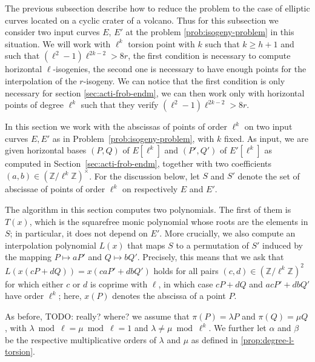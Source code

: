 \documentclass{lms}
\newcommand{\todo}[1]{{\color{red}TODO: #1}}
\begin{document}
 The previous subsection describe how to reduce the problem to the case of elliptic curves located on a cyclic crater of a volcano. Thus for this subsection we consider two input curves $E$, $E'$ at the problem \ref{prob:isogeny-problem} in this situation. We will work with $\ell^{k}$ torsion point with $k$ such that $k \geqslant h+1$ and such that $(\ell^2-1)\ell^{2k-2}> 8 r$, the first condition is necessary to compute horizontal $\ell$-isogenies, the second one is necessary to have enough points for the interpolation of the $r$-isogeny. We can notice that the first condition is only necessary for section \ref{sec:acti-frob-endm}, we can then work only with horizontal points of degree $\ell^k$ such that they verify $(\ell^2-1)\ell^{2k-2}> 8 r$.

In this section we work with the abscissas of points of order $\ell^k$ on two input
curves $E,E'$ as in Problem~\ref{prob:isogeny-problem}, with $k$ fixed.
As input, we are given horizontal bases $(P,Q)$ of $E[\ell^k]$ and
$(P',Q')$ of $E'[\ell^k]$ as computed in
Section~\ref{sec:acti-frob-endm}, together with two coefficients $(a,b)
\in \left(\mathbb{Z}/\ell^k \mathbb{Z} \right)^{\times}$. For the discussion below,
let $S$ and $S'$ denote the set of abscissae of points of order
$\ell^k$ on respectively $E$ and $E'$.

The algorithm in this section computes two polynomials. The first of
them is $T(x)$, which is the squarefree monic polynomial whose roots
are the elements in $S$; in particular, it does not depend on
$E'$. More crucially, we also compute an interpolation polynomial
$L(x)$ that maps $S$ to a permutation of $S'$ induced by the mapping
$P \mapsto aP'$ and $Q \mapsto bQ'$.  Precisely, this means that we
ask that $L(x(cP+dQ))=x(caP'+dbQ')$ holds for all pairs $(c,d) \in
(\mathbb{Z}/\ell^k\mathbb{Z})^2$ for which either $c$ or $d$ is
coprime with $\ell$, in which case $cP+dQ$ and $acP'+dbQ'$ have order
$\ell^k$; here, $x(P)$ denotes the abscissa of a point $P$.

As before, \todo{really? where?} we assume that $\pi(P)=\lambda P$ and
$\pi(Q) = \mu Q$, with $\lambda \bmod \ell = \mu \bmod \ell = 1$ and $\lambda \neq \mu \bmod \ell^k$.  We
further let $\alpha$ and $\beta$ be the respective multiplicative orders %
of $\lambda$ and $\mu$ as defined in \ref{prop:degree-l-torsion}.%
\end{document}
